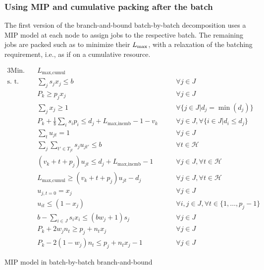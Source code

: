 \documentclass[13pt, letterpaper, oneside]{book}
\begin{document}
\subsubsection{Using MIP and cumulative packing after the batch}

The first version of the branch-and-bound batch-by-batch decomposition uses a
MIP model at each node to assign jobs to the respective batch. The remaining
jobs are packed such as to minimize their $L_{\text{max}}$, with a relaxation of the
batching requirement, i.e., as if on a cumulative resource. 
\begin{model}[h!]
\begin{alignat}{3}
\text{Min.}\quad & L_{\text{max,cumul}} && \\ 
\text{s. t.}\quad & \label{dc:eq1} \sum_j s_j x_j \leq b \quad && \forall j \in J \\
& P_k \geq p_j x_j \quad && \forall j \in J \\
& \label{dc:eq3} \sum_j x_j \geq 1 \quad && \forall \{j \in J | d_j = \min(d_j)\} \\
& \label{dc:eq4} P_k + \frac{1}{b} \sum_{i} s_i p_i \leq d_j +
L_{\text{max,incmb}} - 1 - v_k \quad && \forall j \in J, \forall \{i \in J | d_i
\leq d_j\} \\[2ex]
& \label{dc:eq5} \sum_t u_{jt} = 1 \quad && \forall j \in J \\
& \label{dc:eq6} \sum_j \sum_{t' \in T_{jt}} s_j u_{jt'} \leq b \quad && \forall t \in \mathcal{H} \\
& \label{dc:eq7} (v_k + t + p_j) u_{jt} \leq d_j + L_{\text{max,incmb}} - 1 \quad && \forall j \in J, \forall t \in \mathcal{H} \\
& \label{dc:eq8} L_{\text{max,cumul}} \geq (v_k + t + p_j) u_{jt} - d_j \quad && \forall j \in J, \forall t \in \mathcal{H} \\
& \label{dc:eq9} u_{j,t=0} = x_j \quad && \forall j \in J \\
& \label{dc:eq10} u_{it} \leq (1 - x_j) \quad && \forall i,j \in J, \forall t
\in \{1, \dots, p_j - 1\} \\[2ex]
& \label{dc:eq11} b - \sum_{i \in J} s_i x_i \leq (b w_j + 1) s_j \quad && \forall j \in J \\
& \label{dc:eq12} P_k + 2w_j n_t \geq p_j + n_t x_j \quad && \forall j \in J\\
& \label{dc:eq13} P_k - 2(1 - w_j)n_t \leq p_j +n_t x_j - 1 \quad && \forall j
\in J
\end{alignat}
\caption{MIP model in batch-by-batch branch-and-bound}
\label{model:decomp_mip}
\end{model}
\end{document}
